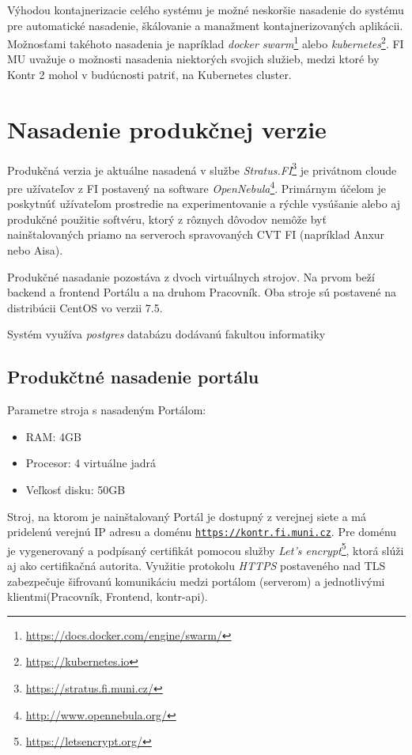 \documentclass[
  digital, %
  twoside, %
  table,   %
  lof,     %
  lot,     %
]{fithesis3}
\begin{document}
Výhodou kontajnerizacie celého systému je možné neskoršie nasadenie do systému pre automatické nasadenie, škálovanie a manažment kontajnerizovaných aplikácii. Možnosťami takéhoto nasadenia je napríklad \emph{docker swarm}\footnote{\url{https://docs.docker.com/engine/swarm/}} alebo \emph{kubernetes}\footnote{\url{https://kubernetes.io}}. FI MU uvažuje o možnosti nasadenia niektorých svojich služieb, medzi ktoré by Kontr 2 mohol v budúcnosti patriť, na Kubernetes cluster.


\section{Nasadenie produkčnej verzie}

Produkčná verzia je aktuálne nasadená v službe \emph{Stratus.FI}\footnote{\url{https://stratus.fi.muni.cz/}} je privátnom cloude pre užívateľov z FI postavený na software \emph{OpenNebula}\footnote{\url{http://www.opennebula.org/}}.
Primárnym účelom je poskytnúť užívateľom prostredie na experimentovanie a rýchle vysúšanie alebo aj produkčné použitie softvéru, ktorý z rôznych dôvodov nemôže byť nainštalovaných priamo na serveroch spravovaných CVT FI (napríklad Anxur nebo Aisa)\cite{fi-tech-stratus}.

Produkčné nasadanie pozostáva z dvoch virtuálnych strojov. Na prvom beží backend a frontend Portálu a na druhom Pracovník. Oba stroje sú postavené na distribúcii CentOS vo verzii 7.5.

Systém využíva \emph{postgres} databázu dodávanú fakultou informatiky

\subsection{Produkčtné nasadenie portálu}

Parametre stroja s nasadeným Portálom:
\begin{itemize}
    \item RAM: 4GB
    \item Procesor: 4 virtuálne jadrá
    \item Veľkosť disku: 50GB
\end{itemize}

Stroj, na ktorom je nainštalovaný Portál je dostupný z verejnej siete a má pridelenú verejnú IP adresu a doménu \texttt{\url{https://kontr.fi.muni.cz}}. Pre doménu je vygenerovaný a podpísaný certifikát pomocou služby \emph{Let's encrypt}\footnote{\url{https://letsencrypt.org/}}, ktorá slúži aj ako certifikačná autorita. Využitie protokolu \emph{HTTPS}\cite{RFC2818} postaveného nad TLS\cite{RFC8446} zabezpečuje šifrovanú komunikáciu medzi portálom (serverom) a jednotlivými klientmi(Pracovník, Frontend, kontr-api).
\end{document}
